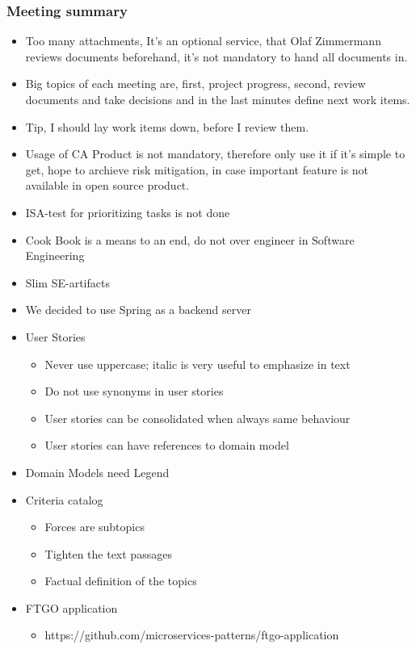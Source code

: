 \documentclass{article}
\begin{document}
\subsubsection{Meeting summary}
\begin{itemize}
\item Too many attachments, It's an optional service, that Olaf Zimmermann reviews documents beforehand, it's not mandatory to hand all documents in.
\item Big topics of each meeting are, first, project progress, second, review documents and take decisions and in the last minutes define next work items.
\item Tip, I should lay work items down, before I review them.
\item Usage of CA Product is not mandatory, therefore only use it if it's simple to get, hope to archieve risk mitigation, in case important feature is not available in open source product.
\item ISA-test for prioritizing tasks is not done
\item Cook Book is a means to an end, do not over engineer in Software Engineering
\item Slim SE-artifacts
\item We decided to use Spring as a backend server
\item User Stories
    \begin{itemize}
        \item Never use uppercase; italic is very useful to emphasize in text
        \item Do not use synonyms in user stories
        \item User stories can be consolidated when always same behaviour
        \item User stories can have references to domain model
    \end{itemize}
\item Domain Models need Legend
\item Criteria catalog
    \begin{itemize}
        \item Forces are subtopics
        \item Tighten the text passages
        \item Factual definition of the topics
    \end{itemize}
\item FTGO application
    \begin{itemize}
        \item https://github.com/microservices-patterns/ftgo-application

\end{itemize}
\end{itemize}
\end{document}
